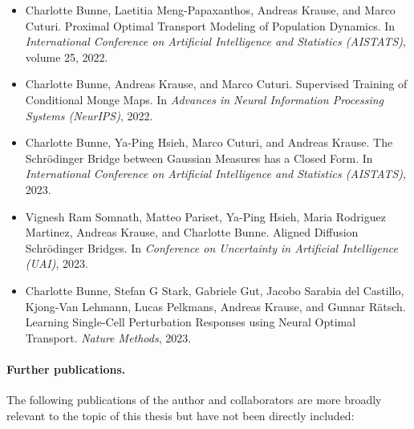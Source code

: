 \begin{itemize}
	\item[] Charlotte Bunne, Laetitia Meng-Papaxanthos, Andreas Krause, and Marco Cuturi. Proximal Optimal Transport Modeling of Population Dynamics. In \textit{International Conference on Artificial Intelligence and Statistics (AISTATS)}, volume 25, 2022.
	\item[] Charlotte Bunne, Andreas Krause, and Marco Cuturi. Supervised Training of Conditional Monge Maps. In \textit{Advances in Neural Information Processing Systems (NeurIPS)}, 2022.
	\item[] Charlotte Bunne, Ya-Ping Hsieh, Marco Cuturi, and Andreas Krause. The Schr{\"o}dinger Bridge between Gaussian Measures has a Closed Form. In \textit{International Conference on Artificial Intelligence and Statistics (AISTATS)}, 2023.
	\item[] Vignesh Ram Somnath, Matteo Pariset, Ya-Ping Hsieh, Maria Rodriguez Martinez, Andreas Krause, and Charlotte Bunne. Aligned Diffusion Schr{\"o}dinger Bridges. In \textit{Conference on Uncertainty in Artificial Intelligence (UAI)}, 2023.
	\item[] Charlotte Bunne, Stefan G Stark, Gabriele Gut, Jacobo Sarabia del Castillo, Kjong-Van Lehmann, Lucas Pelkmans, Andreas Krause, and Gunnar R{\"a}tsch. Learning Single-Cell Perturbation Responses using Neural Optimal Transport. \textit{Nature Methods}, 2023.
\end{itemize}

\paragraph{Further publications.}
The following publications of the author and collaborators are more broadly relevant to the topic of this thesis but have not been directly included:

